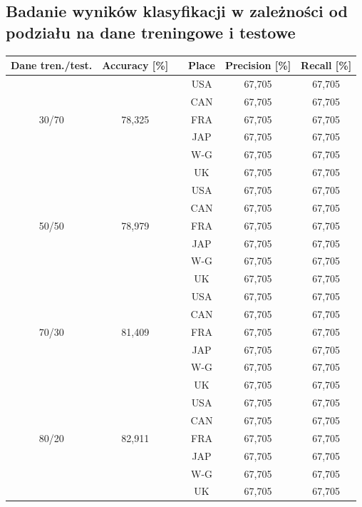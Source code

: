 \documentclass{classrep}
\begin{document}
\subsection{Badanie wyników klasyfikacji w zależności od podziału na dane treningowe i testowe}
\begin{table}[h!]
	\centering
	\begin{tabular} {c c c c c c}
		\hline
		\textbf{Dane tren./test.} & \textbf{Accuracy [\%]} & \vline & \textbf{Place} & \textbf{Precision [\%]} & \textbf{Recall [\%]}\\ [0.5ex] 
		\hline 
		\hline 
		&   			&\vline& USA & 67,705 & 67,705 \\
		&				&\vline& CAN & 67,705 & 67,705 \\
		30/70 & 78,325  &\vline& FRA & 67,705 & 67,705 \\
		&				&\vline& JAP & 67,705 & 67,705 \\
    	&				&\vline& W-G & 67,705 & 67,705 \\
		&		 		&\vline& UK  & 67,705 & 67,705 \\
		\hline
		&   			&\vline& USA & 67,705 & 67,705 \\
		&				&\vline& CAN & 67,705 & 67,705 \\
		50/50 & 78,979  &\vline& FRA & 67,705 & 67,705 \\
		&				&\vline& JAP & 67,705 & 67,705 \\
		&				&\vline& W-G & 67,705 & 67,705 \\
		&		 		&\vline& UK  & 67,705 & 67,705 \\
		\hline
		&   			&\vline& USA & 67,705 & 67,705 \\
		&				&\vline& CAN & 67,705 & 67,705 \\
		70/30 & 81,409  &\vline& FRA & 67,705 & 67,705 \\
		&				&\vline& JAP & 67,705 & 67,705 \\
		&				&\vline& W-G & 67,705 & 67,705 \\
		&		 		&\vline& UK  & 67,705 & 67,705 \\
		\hline
		&   			&\vline& USA & 67,705 & 67,705 \\
		&				&\vline& CAN & 67,705 & 67,705 \\
		80/20 & 82,911  &\vline& FRA & 67,705 & 67,705 \\
		&				&\vline& JAP & 67,705 & 67,705 \\
		&				&\vline& W-G & 67,705 & 67,705 \\
		&		 		&\vline& UK  & 67,705 & 67,705 \\

\end{tabular}
\end{table}
\end{document}

